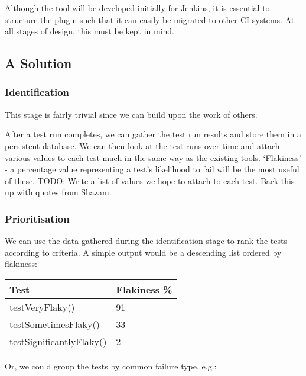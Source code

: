 Although the tool will be developed initially for Jenkins, it is essential to structure the plugin such that it can easily be migrated to other CI systems. At all stages of design, this must be kept in mind.


\subsection{A Solution}

\subsubsection{Identification}

This stage is fairly trivial since we can build upon the work of others.

After a test run completes, we can gather the test run results and store them in a persistent database. We can then look at the test runs over time and attach various values to each test much in the same way as the existing tools. ‘Flakiness’ - a percentage value representing a test’s likelihood to fail will be the most useful of these.
TODO: Write a list of values we hope to attach to each test. Back this up with quotes from Shazam.

\subsubsection{Prioritisation}

We can use the data gathered during the identification stage to rank the tests according to criteria. A simple output would be a descending list ordered by flakiness:

\begin{center}
    \begin{tabular}{ | l | p{5cm} |}
    \hline
    Test & Flakiness \% \\ \hline
    testVeryFlaky() & 91 \\ \hline
    testSometimesFlaky() & 33 \\ \hline
    testSignificantlyFlaky() & 2 \\ \hline
    \end{tabular}
\end{center}

Or, we could group the tests by common failure type, e.g.:


